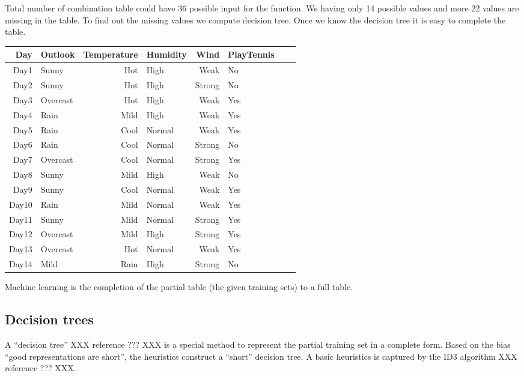 \documentclass{article}
\begin{document}
Total number of combination table could have 36 possible input for the function. We having only 14 possible values and more 22 values are missing in the table. To find out the missing values we compute decision tree. Once we know the decision tree it is easy to complete the table.

\begin{tabular}{|r|l|r|l|r|l|r|l|}

\hline
Day & Outlook & Temperature & Humidity & Wind & PlayTennis & \\[5pt]
\hline

Day1 & Sunny & Hot & High & Weak & No &
\\\hline
Day2 & Sunny & Hot & High & Strong & No &
\\\hline
Day3 & Overcast & Hot & High & Weak & Yes &
\\\hline
Day4 & Rain & Mild & High & Weak & Yes &
\\\hline
Day5 & Rain & Cool & Normal & Weak & Yes &
\\\hline
Day6 & Rain & Cool & Normal & Strong & No &
\\\hline
Day7 & Overcast & Cool & Normal & Strong & Yes &
\\\hline
Day8 & Sunny & Mild & High & Weak & No &
\\\hline
Day9 & Sunny & Cool & Normal & Weak & Yes &
\\\hline
Day10 & Rain & Mild & Normal & Weak & Yes &
\\\hline
Day11 & Sunny & Mild & Normal & Strong & Yes &
\\\hline
Day12 & Overcast & Mild & High & Strong & Yes &
\\\hline
Day13 & Overcast & Hot & Normal & Weak & Yes &
\\\hline
Day14 & Mild & Rain & High & Strong & No &
\\\hline
\end{tabular}




Machine learning is the completion of the partial table (the given training sets) to a full table.



\subsection{Decision trees}
\label{sec:dectree}

A ``decision tree'' XXX reference ??? XXX is a special method to represent the partial training set in a complete form. Based on the bias ``good representations are short'', the heuristics construct a ``short'' decision tree. A basic heuristics is captured by the ID3 algorithm XXX reference ??? XXX.
\end{document}
